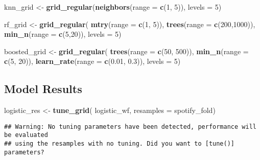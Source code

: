 \documentclass[
]{article}
\newenvironment{Shaded}{\begin{snugshade}}{\end{snugshade}}
\newcommand{\AttributeTok}[1]{\textcolor[rgb]{0.13,0.29,0.53}{#1}}
\newcommand{\DecValTok}[1]{\textcolor[rgb]{0.00,0.00,0.81}{#1}}
\newcommand{\FloatTok}[1]{\textcolor[rgb]{0.00,0.00,0.81}{#1}}
\newcommand{\FunctionTok}[1]{\textcolor[rgb]{0.13,0.29,0.53}{\textbf{#1}}}
\newcommand{\NormalTok}[1]{#1}
\newcommand{\OtherTok}[1]{\textcolor[rgb]{0.56,0.35,0.01}{#1}}
\begin{document}
\begin{Shaded}
\begin{Highlighting}[]
\NormalTok{knn\_grid }\OtherTok{\textless{}{-}} \FunctionTok{grid\_regular}\NormalTok{(}\FunctionTok{neighbors}\NormalTok{(}\AttributeTok{range =} \FunctionTok{c}\NormalTok{(}\DecValTok{1}\NormalTok{, }\DecValTok{5}\NormalTok{)), }\AttributeTok{levels =} \DecValTok{5}\NormalTok{)}

\NormalTok{rf\_grid }\OtherTok{\textless{}{-}} \FunctionTok{grid\_regular}\NormalTok{(}
  \FunctionTok{mtry}\NormalTok{(}\AttributeTok{range =} \FunctionTok{c}\NormalTok{(}\DecValTok{1}\NormalTok{, }\DecValTok{5}\NormalTok{)), }
  \FunctionTok{trees}\NormalTok{(}\AttributeTok{range =} \FunctionTok{c}\NormalTok{(}\DecValTok{200}\NormalTok{,}\DecValTok{1000}\NormalTok{)), }
  \FunctionTok{min\_n}\NormalTok{(}\AttributeTok{range =} \FunctionTok{c}\NormalTok{(}\DecValTok{5}\NormalTok{,}\DecValTok{20}\NormalTok{)), }
  \AttributeTok{levels =} \DecValTok{5}\NormalTok{)}


\NormalTok{boosted\_grid }\OtherTok{\textless{}{-}} \FunctionTok{grid\_regular}\NormalTok{(}
    \FunctionTok{trees}\NormalTok{(}\AttributeTok{range =} \FunctionTok{c}\NormalTok{(}\DecValTok{50}\NormalTok{, }\DecValTok{500}\NormalTok{)),}
    \FunctionTok{min\_n}\NormalTok{(}\AttributeTok{range =} \FunctionTok{c}\NormalTok{(}\DecValTok{5}\NormalTok{, }\DecValTok{20}\NormalTok{)),}
    \FunctionTok{learn\_rate}\NormalTok{(}\AttributeTok{range =} \FunctionTok{c}\NormalTok{(}\FloatTok{0.01}\NormalTok{, }\FloatTok{0.3}\NormalTok{)),}
    \AttributeTok{levels =} \DecValTok{5}\NormalTok{)}
\end{Highlighting}
\end{Shaded}

\hypertarget{model-results}{%
\subsection{Model Results}\label{model-results}}

\begin{Shaded}
\begin{Highlighting}[]
\NormalTok{logistic\_res }\OtherTok{\textless{}{-}} \FunctionTok{tune\_grid}\NormalTok{(}
\NormalTok{  logistic\_wf,}
  \AttributeTok{resamples =}\NormalTok{ spotify\_fold)}
\end{Highlighting}
\end{Shaded}

\begin{verbatim}
## Warning: No tuning parameters have been detected, performance will be evaluated
## using the resamples with no tuning. Did you want to [tune()] parameters?
\end{verbatim}
\end{document}
